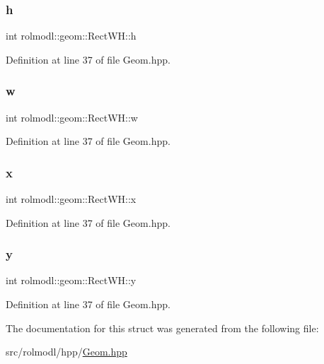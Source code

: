 \subsubsection{\texorpdfstring{h}{h}}
{\footnotesize\ttfamily int rolmodl\+::geom\+::\+Rect\+W\+H\+::h}



Definition at line 37 of file Geom.\+hpp.

\mbox{\label{structrolmodl_1_1geom_1_1_rect_w_h_ab2e025f1f2917ba1573b28cfb94b43a2}} 
\subsubsection{\texorpdfstring{w}{w}}
{\footnotesize\ttfamily int rolmodl\+::geom\+::\+Rect\+W\+H\+::w}



Definition at line 37 of file Geom.\+hpp.

\mbox{\label{structrolmodl_1_1geom_1_1_rect_w_h_a3f7a0a045ddd53a3546ea63fc167d5a0}} 
\subsubsection{\texorpdfstring{x}{x}}
{\footnotesize\ttfamily int rolmodl\+::geom\+::\+Rect\+W\+H\+::x}



Definition at line 37 of file Geom.\+hpp.

\mbox{\label{structrolmodl_1_1geom_1_1_rect_w_h_a26a6551209bbfacc69a4a2c56f2085a5}} 
\subsubsection{\texorpdfstring{y}{y}}
{\footnotesize\ttfamily int rolmodl\+::geom\+::\+Rect\+W\+H\+::y}



Definition at line 37 of file Geom.\+hpp.



The documentation for this struct was generated from the following file\+:\begin{DoxyCompactItemize}
\item 
src/rolmodl/hpp/\mbox{\hyperlink{_geom_8hpp}{Geom.\+hpp}}\end{DoxyCompactItemize}
